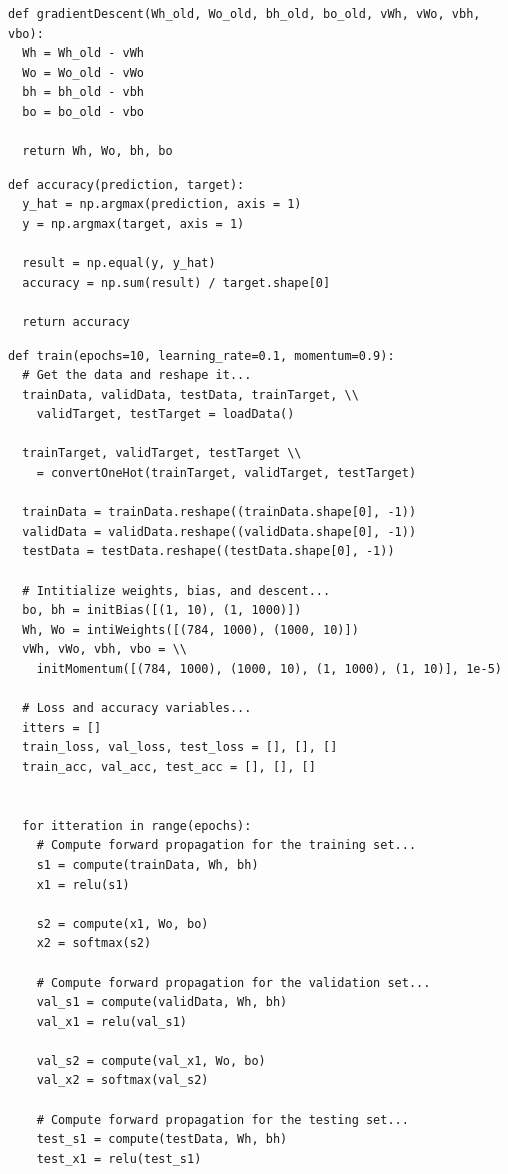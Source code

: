 \documentclass[12pt]{article}
\begin{document}
\begin{verbatim}
def gradientDescent(Wh_old, Wo_old, bh_old, bo_old, vWh, vWo, vbh, vbo):
  Wh = Wh_old - vWh
  Wo = Wo_old - vWo
  bh = bh_old - vbh
  bo = bo_old - vbo
  
  return Wh, Wo, bh, bo
\end{verbatim}

\begin{verbatim}
def accuracy(prediction, target):
  y_hat = np.argmax(prediction, axis = 1)
  y = np.argmax(target, axis = 1)

  result = np.equal(y, y_hat)
  accuracy = np.sum(result) / target.shape[0]
  
  return accuracy
\end{verbatim}

\begin{verbatim}
def train(epochs=10, learning_rate=0.1, momentum=0.9):
  # Get the data and reshape it...
  trainData, validData, testData, trainTarget, \\
    validTarget, testTarget = loadData()

  trainTarget, validTarget, testTarget \\
    = convertOneHot(trainTarget, validTarget, testTarget)

  trainData = trainData.reshape((trainData.shape[0], -1))
  validData = validData.reshape((validData.shape[0], -1))
  testData = testData.reshape((testData.shape[0], -1))

  # Intitialize weights, bias, and descent...
  bo, bh = initBias([(1, 10), (1, 1000)])
  Wh, Wo = intiWeights([(784, 1000), (1000, 10)])
  vWh, vWo, vbh, vbo = \\
    initMomentum([(784, 1000), (1000, 10), (1, 1000), (1, 10)], 1e-5)

  # Loss and accuracy variables...
  itters = []
  train_loss, val_loss, test_loss = [], [], []
  train_acc, val_acc, test_acc = [], [], []


  for itteration in range(epochs):
    # Compute forward propagation for the training set...
    s1 = compute(trainData, Wh, bh)
    x1 = relu(s1)

    s2 = compute(x1, Wo, bo)
    x2 = softmax(s2)

    # Compute forward propagation for the validation set...
    val_s1 = compute(validData, Wh, bh)
    val_x1 = relu(val_s1)

    val_s2 = compute(val_x1, Wo, bo)
    val_x2 = softmax(val_s2)

    # Compute forward propagation for the testing set...
    test_s1 = compute(testData, Wh, bh)
    test_x1 = relu(test_s1)


\end{verbatim}
\end{document}
